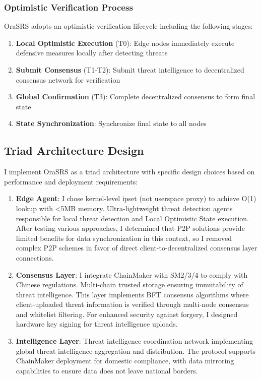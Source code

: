 \documentclass[12pt]{article}
\begin{document}
\subsubsection{Optimistic Verification Process}
OraSRS adopts an optimistic verification lifecycle including the following stages:

\begin{enumerate}
\item \textbf{Local Optimistic Execution} (T0): Edge nodes immediately execute defensive measures locally after detecting threats
\item \textbf{Submit Consensus} (T1-T2): Submit threat intelligence to decentralized consensus network for verification
\item \textbf{Global Confirmation} (T3): Complete decentralized consensus to form final state
\item \textbf{State Synchronization}: Synchronize final state to all nodes
\end{enumerate}

\subsection{Triad Architecture Design}

I implement OraSRS as a triad architecture with specific design choices based on performance and deployment requirements:

\begin{enumerate}
\item \textbf{Edge Agent}: I chose kernel-level ipset (not userspace proxy) to achieve O(1) lookup with <5MB memory. Ultra-lightweight threat detection agents responsible for local threat detection and Local Optimistic State execution. After testing various approaches, I determined that P2P solutions provide limited benefits for data synchronization in this context, so I removed complex P2P schemes in favor of direct client-to-decentralized consensus layer connections.
\item \textbf{Consensus Layer}: I integrate ChainMaker with SM2/3/4 to comply with Chinese regulations. Multi-chain trusted storage ensuring immutability of threat intelligence. This layer implements BFT consensus algorithms where client-uploaded threat information is verified through multi-node consensus and whitelist filtering. For enhanced security against forgery, I designed hardware key signing for threat intelligence uploads.
\item \textbf{Intelligence Layer}: Threat intelligence coordination network implementing global threat intelligence aggregation and distribution. The protocol supports ChainMaker deployment for domestic compliance, with data mirroring capabilities to ensure data does not leave national borders.
\end{enumerate}
\end{document}
